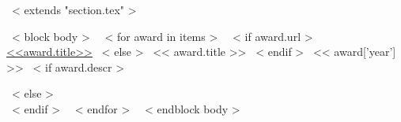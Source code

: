 ~< extends "section.tex" >~

~< block body >~
~< for award in items >~
  ~< if award.url >~
    \href{<<award.url>>}{<<award.title>>}
  ~< else >~
    << award.title >>
  ~< endif >~
  \hfill << award['year'] >>
  ~< if award.descr >~
    \\ {\scriptsize \color{gray}{<< award.descr >>} \par}
  ~< else >~
    \\[3mm]
  ~< endif >~
~< endfor >~
~< endblock body >~
